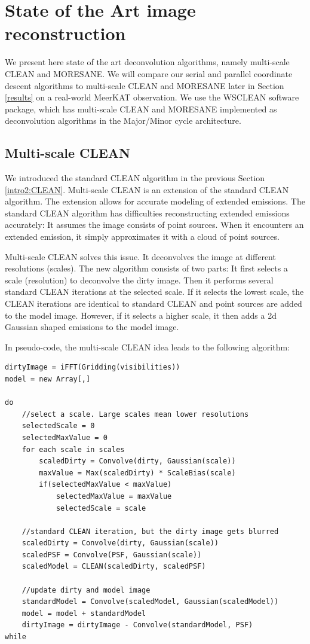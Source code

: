 \section{State of the Art image reconstruction}\label{state}
We present here state of the art deconvolution algorithms, namely multi-scale CLEAN and MORESANE. We will compare our serial and parallel coordinate descent algorithms to multi-scale CLEAN and MORESANE later in Section \ref{results} on a real-world MeerKAT observation. We use the WSCLEAN \cite{offringa2014wsclean} software package, which has multi-scale CLEAN and MORESANE implemented as deconvolution algorithms in the Major/Minor cycle architecture.

\subsection{Multi-scale CLEAN}
We introduced the standard CLEAN algorithm in the previous Section \ref{intro2:CLEAN}.  Multi-scale CLEAN is an extension of the standard CLEAN algorithm. The extension allows for accurate modeling of extended emissions. The standard CLEAN algorithm has difficulties reconstructing extended emissions accurately: It assumes the image consists of point sources. When it encounters an extended emission, it simply approximates it with a cloud of point sources. 

Multi-scale CLEAN solves this issue. It deconvolves the image at different resolutions (scales). The new algorithm consists of two parts: It first selects a scale (resolution) to deconvolve the dirty image. Then it performs several standard CLEAN iterations at the selected scale. If it selects the lowest scale, the CLEAN iterations are identical to standard CLEAN and point sources are added to the model image. However, if it selects a higher scale, it then adds a 2d Gaussian shaped emissions to the model image.

In pseudo-code, the multi-scale CLEAN idea leads to the following algorithm:
\begin{lstlisting}
dirtyImage = iFFT(Gridding(visibilities))
model = new Array[,]

do
	//select a scale. Large scales mean lower resolutions
	selectedScale = 0
	selectedMaxValue = 0
	for each scale in scales
		scaledDirty = Convolve(dirty, Gaussian(scale))
		maxValue = Max(scaledDirty) * ScaleBias(scale)
		if(selectedMaxValue < maxValue)
			selectedMaxValue = maxValue
			selectedScale = scale
			
	//standard CLEAN iteration, but the dirty image gets blurred
	scaledDirty = Convolve(dirty, Gaussian(scale))
	scaledPSF = Convolve(PSF, Gaussian(scale))
	scaledModel = CLEAN(scaledDirty, scaledPSF)
	
	//update dirty and model image
	standardModel = Convolve(scaledModel, Gaussian(scaledModel))
	model = model + standardModel
	dirtyImage = dirtyImage - Convolve(standardModel, PSF)
while
\end{lstlisting}

